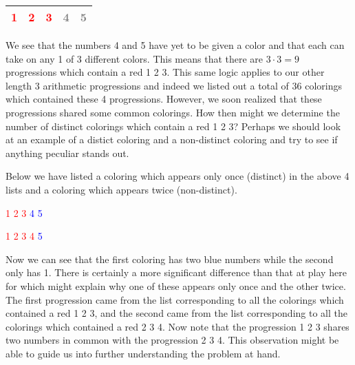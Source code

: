 \documentclass[12pt, a4paper]{article}
\begin{document}
\vspace{4mm}

\begin{table}[htb]
    \centering
    \begin{tabular}{|l|l|l|l|l|}
        \hline
        \textcolor{red}{1} & \textcolor{red}{2} & \textcolor{red}{3} & \textcolor{gray}{4} & \textcolor{gray}{5} \\ \hline
    \end{tabular}
\end{table}

\vspace{2mm}

\noindent We see that the numbers 4 and 5 have yet to be given a color and that each can take on any 1 of 3 different colors. This means that there are $3\cdot 3=9$ progressions which contain a red 1 2 3. This same logic applies to our other length 3 arithmetic progressions and indeed we listed out a total of 36 colorings which contained these 4 progressions. However, we soon realized that these progressions shared some common colorings. How then might we determine the number of distinct colorings which contain a red 1 2 3? Perhaps we should look at an example of a distict coloring and a non-distinct coloring and try to see if anything peculiar stands out. \par
Below we have listed a coloring which appears only once (distinct) in the above 4 lists and a coloring which appears twice (non-distinct).

\begin{center}
    \textcolor{red}{1 2 3 }\textcolor{blue}{ 4 5}\par
    \vspace{2mm}
    \textcolor{red}{1 2 3 4 }\textcolor{blue}{5}
    
\end{center}

\noindent Now we can see that the first coloring has two blue numbers while the second only has 1. There is certainly a more significant difference than that at play here for which might explain why one of these appears only once and the other twice. The first progression came from the list corresponding to all the colorings which contained a red 1 2 3, and the second came from the list corresponding to all the colorings which contained a red 2 3 4. Now note that the progression 1 2 3 shares two numbers in common with the progression 2 3 4. This observation might be able to guide us into further understanding the problem at hand.
\end{document}
